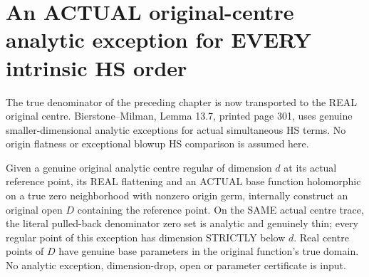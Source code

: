 \section{An ACTUAL original-centre analytic exception for EVERY intrinsic HS order}

The true denominator of the preceding chapter is now transported to the
REAL original centre. Bierstone--Milman\cite{bierstone-milman97-invent-math},
Lemma 13.7, printed page 301, uses genuine smaller-dimensional analytic
exceptions for actual simultaneous HS terms. No origin flatness or
exceptional blowup HS comparison is assumed here.

\begin{lemma}
\label{hir:actual-original-centre-denominator-analytic-thin-window}
\leanok
Given a genuine original analytic centre regular of dimension $d$ at its
actual reference point, its REAL flattening and an ACTUAL base function
holomorphic on a true zero neighborhood with nonzero origin germ, internally
construct an original open $D$ containing the reference point. On the SAME
actual centre trace, the literal pulled-back denominator zero set is
analytic and genuinely thin; every regular point of this exception has
dimension STRICTLY below $d$. Real centre points of $D$ have genuine base
parameters in the original function's true domain. No analytic exception,
dimension-drop, open or parameter certificate is input.
\end{lemma}
